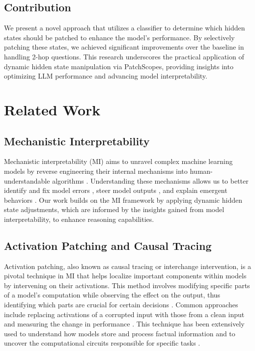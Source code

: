 \documentclass[11pt]{article}
\begin{document}
\subsection*{Contribution}
We present a novel approach that utilizes a classifier to determine which hidden states should be patched to enhance the model’s performance. By selectively patching these states, we achieved significant improvements over the baseline in handling 2-hop questions. This research underscores the practical application of dynamic hidden state manipulation via PatchScopes, providing insights into optimizing LLM performance and advancing model interpretability.

\section{Related Work}

\subsection*{Mechanistic Interpretability}

Mechanistic interpretability (MI) aims to unravel complex machine learning models by reverse engineering their internal mechanisms into human-understandable algorithms \cite{geiger2022inducing, olah2020building}. Understanding these mechanisms allows us to better identify and fix model errors \cite{vig2020causal}, steer model outputs \cite{li2023inferencetime}, and explain emergent behaviors \cite{matton2019emergent, barak2022emergent}. Our work builds on the MI framework by applying dynamic hidden state adjustments, which are informed by the insights gained from model interpretability, to enhance reasoning capabilities.

\subsection*{Activation Patching and Causal Tracing}

Activation patching, also known as causal tracing or interchange intervention, is a pivotal technique in MI that helps localize important components within models by intervening on their activations. This method involves modifying specific parts of a model's computation while observing the effect on the output, thus identifying which parts are crucial for certain decisions \cite{vig2020causal, meng2022locating}. Common approaches include replacing activations of a corrupted input with those from a clean input and measuring the change in performance \cite{ghandeharioun2024patchscopes}. This technique has been extensively used to understand how models store and process factual information and to uncover the computational circuits responsible for specific tasks \cite{geva2023dissecting}.
\end{document}
